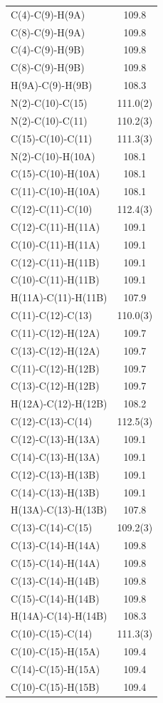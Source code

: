 \begin{center}
{\begin{supertabular}{p{1.5in}c}
C(4)-C(9)-H(9A)&109.8\\
C(8)-C(9)-H(9A)&109.8\\
C(4)-C(9)-H(9B)&109.8\\
C(8)-C(9)-H(9B)&109.8\\
H(9A)-C(9)-H(9B)&108.3\\
N(2)-C(10)-C(15)&111.0(2)\\
N(2)-C(10)-C(11)&110.2(3)\\
C(15)-C(10)-C(11)&111.3(3)\\
N(2)-C(10)-H(10A)&108.1\\
C(15)-C(10)-H(10A)&108.1\\
C(11)-C(10)-H(10A)&108.1\\
C(12)-C(11)-C(10)&112.4(3)\\
C(12)-C(11)-H(11A)&109.1\\
C(10)-C(11)-H(11A)&109.1\\
C(12)-C(11)-H(11B)&109.1\\
C(10)-C(11)-H(11B)&109.1\\
H(11A)-C(11)-H(11B)&107.9\\
C(11)-C(12)-C(13)&110.0(3)\\
C(11)-C(12)-H(12A)&109.7\\
C(13)-C(12)-H(12A)&109.7\\
C(11)-C(12)-H(12B)&109.7\\
C(13)-C(12)-H(12B)&109.7\\
H(12A)-C(12)-H(12B)&108.2\\
C(12)-C(13)-C(14)&112.5(3)\\
C(12)-C(13)-H(13A)&109.1\\
C(14)-C(13)-H(13A)&109.1\\
C(12)-C(13)-H(13B)&109.1\\
C(14)-C(13)-H(13B)&109.1\\
H(13A)-C(13)-H(13B)&107.8\\
C(13)-C(14)-C(15)&109.2(3)\\
C(13)-C(14)-H(14A)&109.8\\
C(15)-C(14)-H(14A)&109.8\\
C(13)-C(14)-H(14B)&109.8\\
C(15)-C(14)-H(14B)&109.8\\
H(14A)-C(14)-H(14B)&108.3\\
C(10)-C(15)-C(14)&111.3(3)\\
C(10)-C(15)-H(15A)&109.4\\
C(14)-C(15)-H(15A)&109.4\\
C(10)-C(15)-H(15B)&109.4\\

\end{supertabular}}
\end{center}
